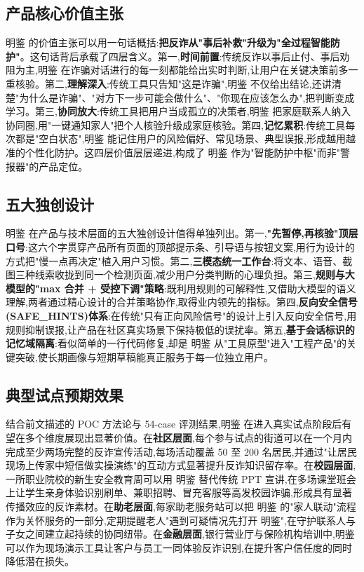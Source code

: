 \documentclass[UTF8,a4paper,12pt]{ctexart}
\begin{document}
\subsection{产品核心价值主张}

明鉴 的价值主张可以用一句话概括:\textbf{把反诈从"事后补救"升级为"全过程智能防护"}。这句话背后承载了四层含义。第一,\textbf{时间前置}:传统反诈以事后止付、事后劝阻为主,明鉴 在诈骗对话进行的每一刻都能给出实时判断,让用户在关键决策前多一重核验。第二,\textbf{理解深入}:传统工具只告知"这是诈骗",明鉴 不仅给出结论,还讲清楚"为什么是诈骗"、"对方下一步可能会做什么"、"你现在应该怎么办",把判断变成学习。第三,\textbf{协同放大}:传统工具把用户当成孤立的决策者,明鉴 把家庭联系人纳入协同圈,用"一键通知家人"把个人核验升级成家庭核验。第四,\textbf{记忆累积}:传统工具每次都是"空白状态",明鉴 能记住用户的风险偏好、常见场景、典型误报,形成越用越准的个性化防护。这四层价值层层递进,构成了 明鉴 作为"智能防护中枢"而非"警报器"的产品定位。

\subsection{五大独创设计}

明鉴 在产品与技术层面的五大独创设计值得单独列出。第一,\textbf{"先暂停,再核验"顶层口号}:这六个字贯穿产品所有页面的顶部提示条、引导语与按钮文案,用行为设计的方式把"慢一点再决定"植入用户习惯。第二,\textbf{三模态统一工作台}:将文本、语音、截图三种线索收拢到同一个检测页面,减少用户分类判断的心理负担。第三,\textbf{规则与大模型的"max 合并 + 受控下调"策略}:既利用规则的可解释性,又借助大模型的语义理解,两者通过精心设计的合并策略协作,取得业内领先的指标。第四,\textbf{反向安全信号(SAFE\_HINTS)体系}:在传统"只有正向风险信号"的设计上引入反向安全信号,用规则抑制误报,让产品在社区真实场景下保持极低的误扰率。第五,\textbf{基于会话标识的记忆域隔离}:看似简单的一行代码修复,却是 明鉴 从"工具原型"进入"工程产品"的关键突破,使长期画像与短期草稿能真正服务于每一位独立用户。

\subsection{典型试点预期效果}

结合前文描述的 POC 方法论与 54-case 评测结果,明鉴 在进入真实试点阶段后有望在多个维度展现出显著价值。在\textbf{社区层面},每个参与试点的街道可以在一个月内完成至少两场完整的反诈宣传活动,每场活动覆盖 50 至 200 名居民,并通过"让居民现场上传家中短信做实操演练"的互动方式显著提升反诈知识留存率。在\textbf{校园层面},一所职业院校的新生安全教育周可以用 明鉴 替代传统 PPT 宣讲,在多场课堂班会上让学生亲身体验识别刷单、兼职招聘、冒充客服等高发校园诈骗,形成具有显著传播效应的反诈素材。在\textbf{助老层面},每家助老服务站可以把 明鉴 的"家人联动"流程作为关怀服务的一部分,定期提醒老人"遇到可疑情况先打开 明鉴",在守护联系人与子女之间建立起持续的协同纽带。在\textbf{金融层面},银行营业厅与保险机构培训中,明鉴 可以作为现场演示工具让客户与员工一同体验反诈识别,在提升客户信任度的同时降低潜在损失。
\end{document}
